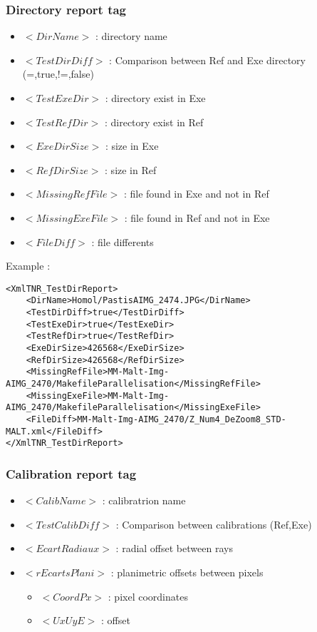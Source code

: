 \documentclass[a4paper]{book}
\begin{document}
\subsubsection{Directory report tag}
\begin{itemize}
\item $<DirName>$ : directory name
\item $<TestDirDiff>$ : Comparison between Ref and Exe directory (=,true,!=,false)
\item $<TestExeDir>$ : directory exist in Exe
\item $<TestRefDir>$ : directory exist in Ref
\item $<ExeDirSize>$ : size in Exe
\item $<RefDirSize>$ : size in Ref
\item $<MissingRefFile>$ : file found in Exe and not in Ref
\item $<MissingExeFile>$ : file found in Ref and not in Exe
\item $<FileDiff>$ : file differents
\end{itemize}

Example : 
\begin{lstlisting}
<XmlTNR_TestDirReport>
	<DirName>Homol/PastisAIMG_2474.JPG</DirName>
	<TestDirDiff>true</TestDirDiff>
	<TestExeDir>true</TestExeDir>
	<TestRefDir>true</TestRefDir>
	<ExeDirSize>426568</ExeDirSize>
	<RefDirSize>426568</RefDirSize>
	<MissingRefFile>MM-Malt-Img-AIMG_2470/MakefileParallelisation</MissingRefFile>
	<MissingExeFile>MM-Malt-Img-AIMG_2470/MakefileParallelisation</MissingExeFile>
	<FileDiff>MM-Malt-Img-AIMG_2470/Z_Num4_DeZoom8_STD-MALT.xml</FileDiff>
</XmlTNR_TestDirReport>
\end{lstlisting}

\subsubsection{Calibration report tag}
\begin{itemize}
\item $<CalibName>$ : calibratrion name
\item $<TestCalibDiff>$ : Comparison between calibrations (Ref,Exe)
\item $<EcartRadiaux>$ : radial offset between rays
\item $<rEcartsPlani>$ : planimetric offsets between pixels
\begin{itemize}
\item $<CoordPx>$ : pixel coordinates
\item $<UxUyE>$ : offset\\
\end{itemize}
\end{itemize}
\end{document}
